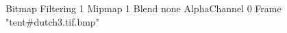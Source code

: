 {Bitmap
	{Filtering 1}
	{Mipmap 1}
	{Blend none}
	{AlphaChannel 0}
	{Frame "tent#dutch3.tif.bmp"}
}
